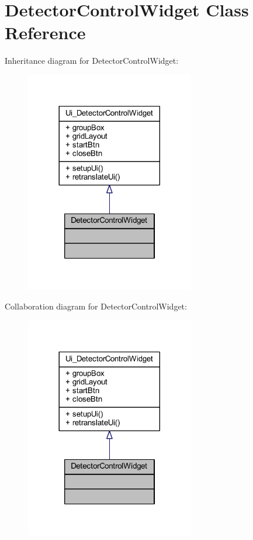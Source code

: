 \hypertarget{class_ui_1_1_detector_control_widget}{}\section{Detector\+Control\+Widget Class Reference}
\label{class_ui_1_1_detector_control_widget}


Inheritance diagram for Detector\+Control\+Widget\+:
\nopagebreak
\begin{figure}[H]
\begin{center}
\leavevmode
\includegraphics[width=209pt]{class_ui_1_1_detector_control_widget__inherit__graph}
\end{center}
\end{figure}


Collaboration diagram for Detector\+Control\+Widget\+:
\nopagebreak
\begin{figure}[H]
\begin{center}
\leavevmode
\includegraphics[width=209pt]{class_ui_1_1_detector_control_widget__coll__graph}
\end{center}
\end{figure}
